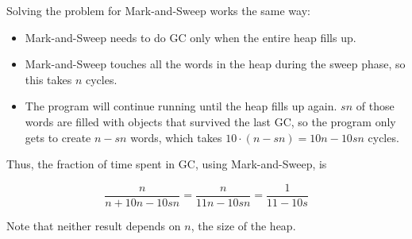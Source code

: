 \documentclass{article}
\begin{document}
\begin{enumerate}
Solving the problem for Mark-and-Sweep works the same way:

\begin{itemize}

\item Mark-and-Sweep needs to do GC only when the entire heap fills up.

\item Mark-and-Sweep touches all the words in the heap during the sweep
phase, so this takes $n$ cycles.

\item The program will continue running until the heap fills up again.
$sn$ of those words are filled with objects that survived the last GC, so
the program only gets to create $n - sn$ words, which takes $10 \cdot (n -
sn) = 10n - 10sn$ cycles.

\end{itemize}

Thus, the fraction of time spent in GC, using Mark-and-Sweep, is 

$$
\frac{n}{n + 10n - 10sn} = \frac{n}{11n - 10sn} = \frac{1}{11 - 10s}
$$

Note that neither result depends on $n$, the size of the heap.

\end{enumerate}
\end{document}
